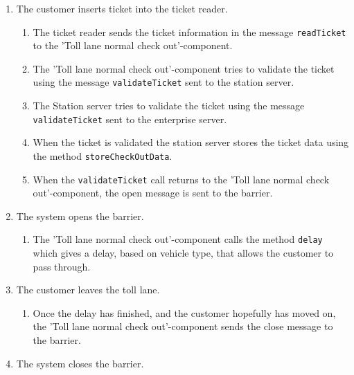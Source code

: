 \begin{enumerate}
\item The customer inserts ticket into the ticket reader.
\begin{enumerate}
\item The ticket reader sends the ticket information in the message \texttt{readTicket} to the 'Toll lane normal check out'-component.
\item The 'Toll lane normal check out'-component tries to validate the ticket using the message \texttt{validateTicket} sent to the station server.
\item The Station server tries to validate the ticket using the message \texttt{validateTicket} sent to the enterprise server.
\item When the ticket is validated the station server stores the ticket data using the method \texttt{storeCheckOutData}.
\item When the \texttt{validateTicket} call returns to the 'Toll lane normal check out'-component, the open message is sent to the barrier.
\end{enumerate}
\item The system opens the  barrier.
\begin{enumerate}
\item The 'Toll lane normal check out'-component calls the method \texttt{delay} which gives a delay, based on vehicle type, that allows the customer to pass through.
\end{enumerate}
\item The customer leaves the toll lane.
\begin{enumerate}
\item Once the delay has finished, and the customer hopefully has moved on, the 'Toll lane normal check out'-component sends the close message to the barrier.
\end{enumerate}
\item The system closes the barrier.

\end{enumerate}
